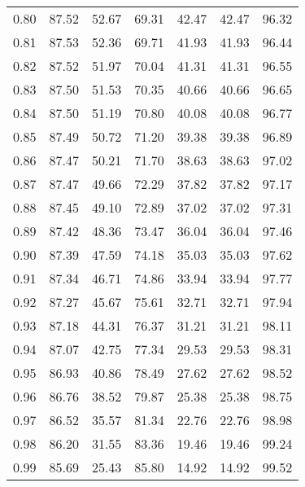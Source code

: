 \begin{tabular}{|c|c|c|c|c|c|c|}
      0.80 &     87.52 &     52.67 &      69.31 &   42.47 &      42.47 &         96.32 \\
      0.81 &     87.53 &     52.36 &      69.71 &   41.93 &      41.93 &         96.44 \\
      0.82 &     87.52 &     51.97 &      70.04 &   41.31 &      41.31 &         96.55 \\
      0.83 &     87.50 &     51.53 &      70.35 &   40.66 &      40.66 &         96.65 \\
      0.84 &     87.50 &     51.19 &      70.80 &   40.08 &      40.08 &         96.77 \\
      0.85 &     87.49 &     50.72 &      71.20 &   39.38 &      39.38 &         96.89 \\
      0.86 &     87.47 &     50.21 &      71.70 &   38.63 &      38.63 &         97.02 \\
      0.87 &     87.47 &     49.66 &      72.29 &   37.82 &      37.82 &         97.17 \\
      0.88 &     87.45 &     49.10 &      72.89 &   37.02 &      37.02 &         97.31 \\
      0.89 &     87.42 &     48.36 &      73.47 &   36.04 &      36.04 &         97.46 \\
      0.90 &     87.39 &     47.59 &      74.18 &   35.03 &      35.03 &         97.62 \\
      0.91 &     87.34 &     46.71 &      74.86 &   33.94 &      33.94 &         97.77 \\
      0.92 &     87.27 &     45.67 &      75.61 &   32.71 &      32.71 &         97.94 \\
      0.93 &     87.18 &     44.31 &      76.37 &   31.21 &      31.21 &         98.11 \\
      0.94 &     87.07 &     42.75 &      77.34 &   29.53 &      29.53 &         98.31 \\
      0.95 &     86.93 &     40.86 &      78.49 &   27.62 &      27.62 &         98.52 \\
      0.96 &     86.76 &     38.52 &      79.87 &   25.38 &      25.38 &         98.75 \\
      0.97 &     86.52 &     35.57 &      81.34 &   22.76 &      22.76 &         98.98 \\
      0.98 &     86.20 &     31.55 &      83.36 &   19.46 &      19.46 &         99.24 \\
      0.99 &     85.69 &     25.43 &      85.80 &   14.92 &      14.92 &         99.52 \\
\bottomrule
\end{tabular}
